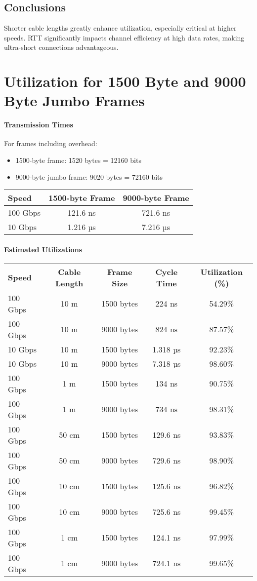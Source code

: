 \documentclass[../HFT-main.tex]{subfiles} %
\begin{document}
\subsection*{Conclusions}
Shorter cable lengths greatly enhance utilization, especially critical at higher speeds. RTT significantly impacts channel efficiency at high data rates, making ultra-short connections advantageous.

\appendix
\section{Utilization for 1500 Byte and 9000 Byte Jumbo Frames}

\paragraph{Transmission Times}
For frames including overhead:
\begin{itemize}
    \item 1500-byte frame: 1520 bytes = 12160 bits
    \item 9000-byte jumbo frame: 9020 bytes = 72160 bits
\end{itemize}

\begin{tabular}{@{}lcc@{}}
\toprule
Speed & 1500-byte Frame & 9000-byte Frame \\
\midrule
100 Gbps & 121.6 ns & 721.6 ns \\
10 Gbps & 1.216 µs & 7.216 µs \\
\bottomrule
\end{tabular}

\paragraph{Estimated Utilizations}

\begin{tabular}{@{}lcccc@{}}
\toprule
Speed & Cable Length & Frame Size & Cycle Time & Utilization (\%) \\
\midrule
100 Gbps & 10 m & 1500 bytes & 224 ns & 54.29\% \\
100 Gbps & 10 m & 9000 bytes & 824 ns & 87.57\% \\
10 Gbps & 10 m & 1500 bytes & 1.318 µs & 92.23\% \\
10 Gbps & 10 m & 9000 bytes & 7.318 µs & 98.60\% \\
100 Gbps & 1 m & 1500 bytes & 134 ns & 90.75\% \\
100 Gbps & 1 m & 9000 bytes & 734 ns & 98.31\% \\
100 Gbps & 50 cm & 1500 bytes & 129.6 ns & 93.83\% \\
100 Gbps & 50 cm & 9000 bytes & 729.6 ns & 98.90\% \\
100 Gbps & 10 cm & 1500 bytes & 125.6 ns & 96.82\% \\
100 Gbps & 10 cm & 9000 bytes & 725.6 ns & 99.45\% \\
100 Gbps & 1 cm & 1500 bytes & 124.1 ns & 97.99\% \\
100 Gbps & 1 cm & 9000 bytes & 724.1 ns & 99.65\% \\
\bottomrule
\end{tabular}
\end{document}
